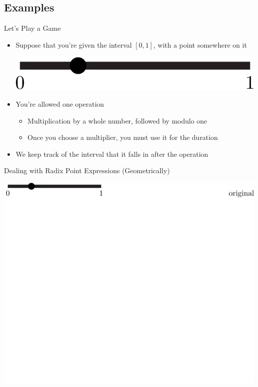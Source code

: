 \documentclass{beamer}
\begin{document}
\subsection{Examples}
\begin{frame}{Let's Play a Game}
\begin{itemize}
  \item Suppose that you're given the interval $[0,1]$, with a point somewhere on it \pause
  \begin{center}
    \includegraphics{images/interval/intervalwithdot}
  \end{center} \pause
    \item You're allowed one operation
    \begin{itemize}
      \item Multiplication by a whole number, followed by modulo one \pause
      \item Once you choose a multiplier, you must use it for the duration \pause
    \end{itemize}
    \item We keep track of the interval that it falls in after the operation
  \end{itemize}
\end{frame}

\begin{frame}{Dealing with Radix Point Expressions (Geometrically)}
  \begin{example}
    \includegraphics[width=\textwidth,height=0.75\textheight]{images/Binary/1}
  \end{example}
\end{frame}
\end{document}
